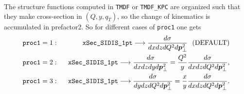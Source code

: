 \documentclass[prd,nofootinbib,eqsecnum,final]{revtex4}
\renewcommand{\(}{\left(}
\renewcommand{\)}{\right)}
\renewcommand{\[}{\left[}
\renewcommand{\]}{\right]}
\renewcommand{\vec}[1]{\bm{#1}}
\begin{document}
The structure functions computed in \texttt{TMDF} or \texttt{TMDF\_KPC} are organized such that they make cross-section in $(Q,y,q_T)$, so the change of kinematics is accumulated in prefactor2. So for different cases of \texttt{proc1} one gets
\begin{eqnarray}
\texttt{proc1}=1:~~&&\text{\texttt{xSec\_SIDIS\_1pt}}\longrightarrow \frac{d\sigma}{dxdzdQ^2 d\vec p_\perp^2}~~(\text{DEFAULT})
\\
\texttt{proc1}=2:~~&&\text{\texttt{xSec\_SIDIS\_1pt}}\longrightarrow \frac{d\sigma}{dxdzdy d\vec p_\perp^2}=\frac{Q^2}{y}\frac{d\sigma}{dxdzdQ^2 d\vec p_\perp^2},
\\
\texttt{proc1}=3:~~&&\text{\texttt{xSec\_SIDIS\_1pt}}\longrightarrow \frac{d\sigma}{dydzdQ^2 d\vec p_\perp^2}=\frac{x}{y}\frac{d\sigma}{dxdzdQ^2 d\vec p_\perp^2}.
\end{eqnarray}
\end{document}
